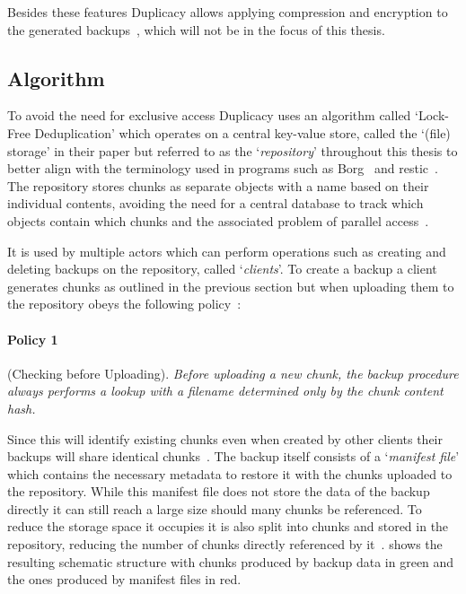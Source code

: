 Besides these features Duplicacy allows applying compression and encryption to
the generated backups~\cite[section `Compression and Encryption']{Duplicacy},
which will not be in the focus of this thesis.

\subsection{Algorithm}\label{sec:algorithm}

To avoid the need for exclusive access Duplicacy uses an algorithm called
`Lock-Free Deduplication' which operates on a central key-value store,
called the `(file) storage' in their paper but referred to as the `\textit{repository}'
throughout this thesis to better align with the terminology used in
programs such as Borg~\cite[section `Internals']{Borg1, Borg2} and
restic~\cite[section `Terminology']{restic}.
The repository stores chunks as separate objects with a name based on their
individual contents, avoiding the need for a central database to track which
objects contain which chunks and the associated problem of parallel
access~\cite[section `Naming Chunks Based Backup']{Duplicacy}.

It is used by multiple actors which can perform operations such as creating
and deleting backups on the repository, called `\textit{clients}'.
To create a backup a client generates chunks as outlined in the previous
section but when uploading them to the repository obeys the following policy~\cite{Duplicacy}:

\begin{samepage}
    \paragraph{Policy 1}\label{para:policy1} (Checking before Uploading).
    \textit{
        Before uploading a new chunk, the backup procedure always performs
        a lookup with a filename determined only by the chunk content hash.
    } \\
\end{samepage}


Since this will identify existing chunks even when created by other clients
their backups will share identical
chunks~\cite[section `Naming Chunks Based Backup']{Duplicacy}.
The backup itself consists of a `\textit{manifest file}' which contains the
necessary metadata to restore it with the chunks uploaded to the repository.
While this manifest file does not store the data of the backup directly it
can still reach a large size should many chunks be referenced.
To reduce the storage space it occupies it is also split into chunks and
stored in the repository, reducing the number of chunks directly referenced
by it~\cite[section `Naming Chunks']{Duplicacy}.
 shows the resulting schematic structure with
chunks produced by backup data in green and the ones produced by manifest files
in red.

